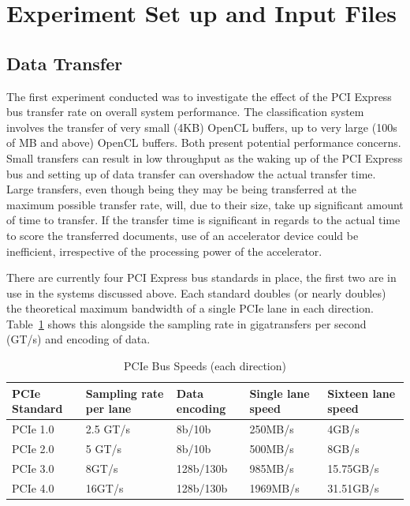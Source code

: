 \section{Experiment Set up and Input Files}

\subsection{Data Transfer}

The first experiment conducted was to investigate the effect of the PCI Express
bus transfer rate on overall system performance. The classification system
involves the transfer of very small (4KB) OpenCL buffers, up to very large (100s
of MB and above) OpenCL buffers. Both present potential performance concerns.
Small transfers can result in low throughput as the waking up of the PCI Express
bus and setting up of data transfer can overshadow the actual transfer time.
Large transfers, even though being they may be being transferred at the maximum
possible transfer rate, will, due to their size, take up significant amount of
time to transfer. If the transfer time is significant in regards to the actual
time to score the transferred documents, use of an accelerator device could be
inefficient, irrespective of the processing power of the accelerator.

There are currently four PCI Express bus standards in place, the first two are
in use in the systems discussed above. Each standard doubles (or nearly doubles)
the theoretical maximum bandwidth of a single PCIe lane in each direction.
Table~\ref{table:pciE} shows this alongside the sampling rate in gigatransfers
per second (GT/s) and encoding of data.

\begin{table}[H]
\begin{tabular}{|l|l|l|l|l|}
\hline
PCIe Standard & Sampling rate per lane & Data encoding & Single lane speed &
Sixteen lane speed\\
\hline
PCIe 1.0 & 2.5 GT/s & 8b/10b & 250MB/s & 4GB/s\\
\hline
PCIe 2.0 & 5 GT/s & 8b/10b & 500MB/s & 8GB/s\\
\hline
PCIe 3.0 & 8GT/s & 128b/130b & 985MB/s & 15.75GB/s\\
\hline
PCIe 4.0 & 16GT/s & 128b/130b & 1969MB/s & 31.51GB/s\\
\hline
\end{tabular}
\caption{PCIe Bus Speeds (each direction)}
\label{table:pciE}
\end{table}

